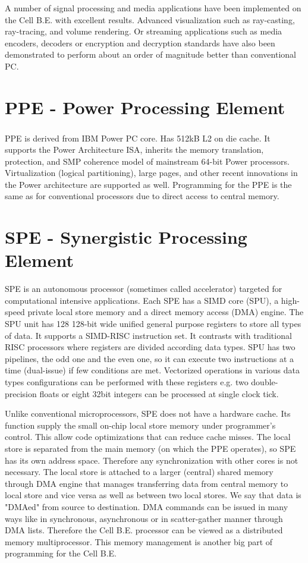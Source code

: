 A number of signal processing and media applications have been implemented on the Cell B.E. with excellent results.
Advanced visualization such as ray-casting, ray-tracing, and volume rendering.
Or streaming applications such as media encoders, decoders or encryption and decryption standards have also been demonstrated to perform about an order of magnitude better than conventional PC.


\section{PPE - Power Processing Element}
PPE is derived from IBM Power PC\textsuperscript{\textregistered} core. Has 512kB L2 on die cache.
It supports the Power Architecture ISA, inherits the memory translation, protection, and SMP coherence model of mainstream 64-bit Power processors.
Virtualization (logical partitioning), large pages, and other recent innovations in the Power architecture are supported as well.
Programming for the PPE is the same as for conventional processors due to direct access to central memory.

\section{SPE - Synergistic Processing Element}

\par
SPE is an autonomous processor (sometimes called accelerator) targeted for computational intensive applications.
Each SPE has a SIMD core (SPU), a high-speed private local store memory and a direct memory access (DMA) engine.
The SPU unit has 128 128-bit wide unified general purpose registers to store all types of data.
It supports a SIMD-RISC instruction set.
It contrasts with traditional RISC processors where registers are divided according data types.
SPU has two pipelines, the odd one and the even one, so it can execute two instructions at a time (dual-issue) if few conditions are met.
Vectorized operations in various data types configurations can be performed with these registers e.g. two double-precision floats or eight 32bit integers can be processed at single clock tick.

\par
Unlike conventional microprocessors, SPE does not have a hardware cache.
Its function supply the small on-chip local store memory under programmer's control.
This allow code optimizations that can reduce cache misses.
The local store is separated from the main memory (on which the PPE operates), so SPE has its own address space.
Therefore any synchronization with other cores is not necessary.
The local store is attached to a larger (central) shared memory through DMA engine that manages transferring data from central memory to local store and vice versa as well as between two local stores.
We say that data is "DMAed" from source to destination.
DMA commands can be issued in many ways like in synchronous, asynchronous or in scatter-gather manner through DMA lists.
Therefore the Cell B.E. processor can be viewed as a distributed memory multiprocessor.
This memory management is another big part of programming for the Cell B.E.

